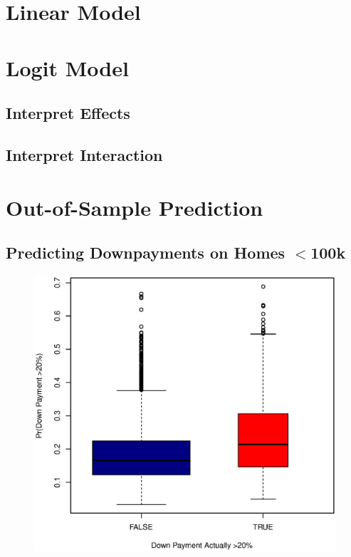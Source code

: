 \documentclass[11pt, fleqn]{article}
\begin{document}
\section{Linear Model}


\section{Logit Model}

\subsection{Interpret Effects}


\subsection{Interpret Interaction}


\section{Out-of-Sample Prediction}
\subsection{Predicting Downpayments on Homes $<$100k}
\begin{figure}[!htb]
  \centering
  \includegraphics[scale=.5]{oos_lt100k.eps}
  \caption{}
  \label{fig:oos_lt100k}
\end{figure}
\end{document}
